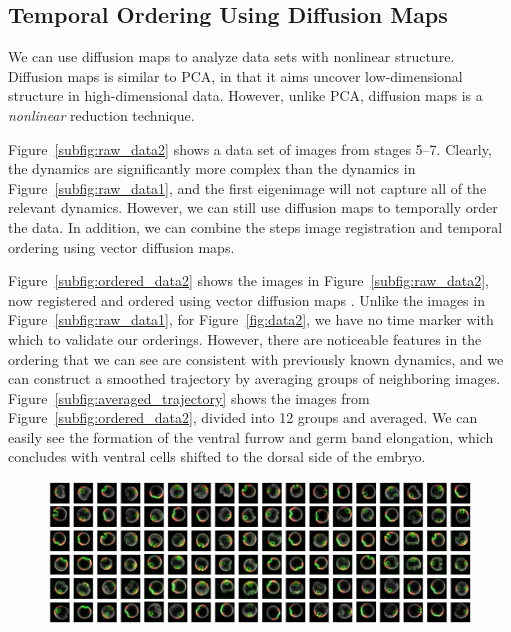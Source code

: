 \documentclass{pnastwo}
\begin{document}
\begin{article}
\subsection{Temporal Ordering Using Diffusion Maps}

We can use diffusion maps \cite{coifman2005geometric} to analyze data sets with nonlinear structure.
%
Diffusion maps is similar to PCA, in that it aims uncover low-dimensional structure in high-dimensional data.
%
However, unlike PCA, diffusion maps is a {\it nonlinear} reduction technique. 

Figure~\ref{subfig:raw_data2} shows a data set of images from stages 5--7.
%
Clearly, the dynamics are significantly more complex than the dynamics in Figure~\ref{subfig:raw_data1}, and the first eigenimage will not capture all of the relevant dynamics.
%
However, we can still use diffusion maps to temporally order the data.
%
In addition, we can combine the steps image registration and temporal ordering using vector diffusion maps. 

Figure~\ref{subfig:ordered_data2} shows the images in Figure~\ref{subfig:raw_data2}, now registered and ordered using vector diffusion maps \cite{singer2012vector}.
%
Unlike the images in Figure~\ref{subfig:raw_data1}, 
for Figure~\ref{fig:data2}, we have no time marker with which to validate our orderings.
%
However, there are noticeable features in the ordering that we can see are consistent with previously known dynamics,
and we can construct a smoothed trajectory by averaging groups of neighboring images.
%
Figure~\ref{subfig:averaged_trajectory} shows the images from Figure~\ref{subfig:ordered_data2}, divided into 12 groups and averaged. 
%
We can easily see the formation of the ventral furrow and germ band elongation, which concludes with ventral cells shifted to the dorsal side of the embryo.

\newpage
\begin{figure}[b]
\includegraphics[width=16.8cm]{raw_data2}


\end{figure}
\end{article}
\end{document}

